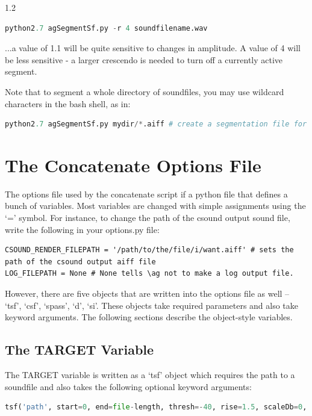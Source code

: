 \documentclass{article}
\newcommand{\ag}{audioguide1.1 }
\begin{document}
\begin{spacing}{1.2}
\begin{lstlisting}[language=python]
python2.7 agSegmentSf.py -r 4 soundfilename.wav
\end{lstlisting}

...a value of 1.1 will be quite sensitive to changes in amplitude.  A value of 4 will be less sensitive - a larger crescendo is needed to turn off a currently active segment.

Note that to segment a whole directory of soundfiles, you may use wildcard characters in the bash shell, as in:
\begin{lstlisting}[language=python]
python2.7 agSegmentSf.py mydir/*.aiff # create a segmentation file for each aiff file located in mydir/
\end{lstlisting}


\section{The Concatenate Options File}
The options file used by the concatenate script if a python file that defines a bunch of variables.  Most variables are changed with simple assignments using the `=' symbol.  For instance, to change the path of the csound output sound file, write the following in your options.py file:
\begin{lstlisting}
CSOUND_RENDER_FILEPATH = '/path/to/the/file/i/want.aiff' # sets the path of the csound output aiff file
LOG_FILEPATH = None # None tells \ag not to make a log output file.
\end{lstlisting}


However, there are five objects that are written into the options file as well -- `tsf', `csf', `spass', `d', `si'.  These objects take required parameters and also take keyword arguments.  The following sections describe the object-style variables.

\subsection{The TARGET Variable}\label{target}
The TARGET variable is written as a `tsf' object which requires the path to a soundfile and also takes the following optional keyword arguments:

\begin{lstlisting}[language=python]
tsf('path', start=0, end=file-length, thresh=-40, rise=1.5, scaleDb=0, minSegLen=0.05, maxSegLen=1000, midiPitchMethod='composite', stretch=1)
\end{lstlisting}


\end{spacing}
\end{document}
